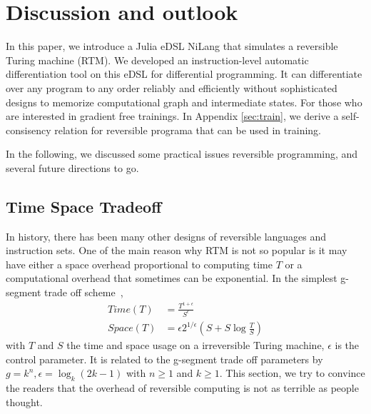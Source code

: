 \documentclass[aps,twocolumn,longbibliography,english,superscriptaddress]{revtex4-1}
\newcommand{\<}{\langle}
\renewcommand{\>}{\rangle}
\newcommand{\Tr}{{\rm Tr}}
\newcommand{\App}[1]{Appendix \ref{#1}}
\theoremstyle{definition}\newtheorem{definition}{\textit{Definition}}
\begin{document}


\section{Discussion and outlook}\label{sec:discussion}
In this paper, we introduce a Julia eDSL NiLang that simulates a reversible Turing machine (RTM).
We developed an instruction-level automatic differentiation tool on this eDSL for differential programming.
It can differentiate over any program to any order reliably and efficiently without sophisticated designs to memorize computational graph and intermediate states.
For those who are interested in gradient free trainings. In \App{sec:train}, we derive a self-consisency relation for reversible programa that can be used in training.

In the following, we discussed some practical issues reversible programming, and several future directions to go.

\subsection{Time Space Tradeoff}\label{sec:timespace}
In history, there has been many other designs of reversible languages and instruction sets.
One of the main reason why RTM is not so popular is it may have either a space overhead proportional to computing time $T$ or a computational overhead that sometimes can be exponential.
In the simplest g-segment trade off scheme~\cite{Bennett1989,Levine1990},
\begin{align}
    Time(T) &= \frac{T^{1+\epsilon}}{S^\epsilon}\\
    Space(T) &= \epsilon 2^{1/\epsilon}(S+S\log\frac{T}{S})
\end{align}
with $T$ and $S$ the time and space usage on a irreversible Turing machine, $\epsilon$ is the control parameter.
It is related to the g-segment trade off parameters by $g = k^n, \epsilon = \log_k(2k-1)$ with $n\geq 1$ and $k\geq 1$.
This section, we try to convince the readers that the overhead of reversible computing is not as terrible as people thought.
\end{document}

